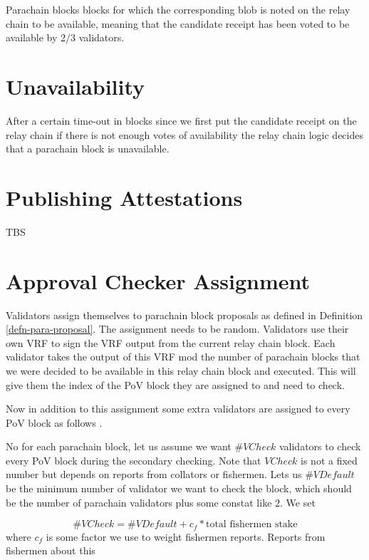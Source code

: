 \begin{definition}
  \label{defn-available-parablock-proposal}
        Parachain blocks blocks for which the corresponding blob is  noted on the relay chain to be available, meaning that the candidate receipt has been voted to be available by 2/3 validators.
\end{definition}

\section{Unavailability}
\label{sect-unavailability}
After a certain time-out in blocks since we first put the candidate receipt on the relay chain if there is not enough votes of availability the relay chain logic decides that a parachain block is unavailable. 

\section{Publishing Attestations}
\label{sect-publishing-attestations}
TBS 

\section{Approval Checker Assignment}
\label{sect-shot-assignment}

Validators assign themselves to parachain block proposals as defined in Definition \ref{defn-para-proposal}. The assignment needs to be random. Validators use their own VRF to sign the VRF output from the current relay chain block. Each validator takes the output of this VRF mod the number of parachain blocks that we were decided to be available in this relay chain block and executed. This will give them the index of the PoV block they are assigned to and need to check.

Now in addition to this assignment some extra validators are assigned to every PoV block as follows .

No for each parachain block, let us assume we want $\#VCheck$ validators to check every PoV block during the secondary checking. Note that $VCheck$ is not a fixed number but depends on reports from collators or fishermen. Lets us $\#VDefault$ be the minimum number of validator we want to check the block, which should be the number of parachain validators plus some constat like $2$.  We set

$$\#VCheck = \#VDefault + c_f * \textrm{total fishermen stake}$$
where $c_f$ is some factor we use to weight fishermen reports. Reports from fishermen about this 

